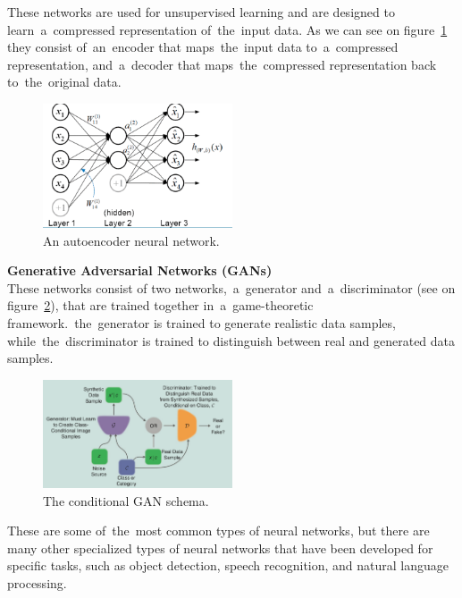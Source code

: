 These networks are used for unsupervised learning and are designed to learn~a~compressed representation of~the~input data. As we can see on figure~\ref{fig:ann} they consist of~an~encoder that maps~the~input data to~a~compressed representation, and~a~decoder that maps~the~compressed representation back to~the~original data.
    \begin{center}
        \begin{figure}[!ht]
            \centering
            \includegraphics[width=0.5\textwidth]{figures/ann}
            \caption{An autoencoder neural network. \cite{luo2018distributed}}
            \label{fig:ann}
        \end{figure}
    \end{center}
\textbf{Generative Adversarial Networks (GANs)}\\
These networks consist of two networks,~a~generator and~a~discriminator (see on figure~\ref{fig:gan}), that are trained together in~a~game-theoretic framework.~the~generator is trained to generate realistic data samples, while~the~discriminator is trained to distinguish between real and generated data samples.
    \begin{center}
        \begin{figure}[!ht]
            \centering
            \includegraphics[width=0.5\textwidth]{figures/gan}
            \caption{The conditional GAN schema. \cite{creswell2018generative}}
            \label{fig:gan}
        \end{figure}
    \end{center}

These are some of~the~most common types of neural networks, but there are many other specialized types of neural
networks that have been developed for specific tasks, such as object detection, speech recognition, and
natural language processing.\\

